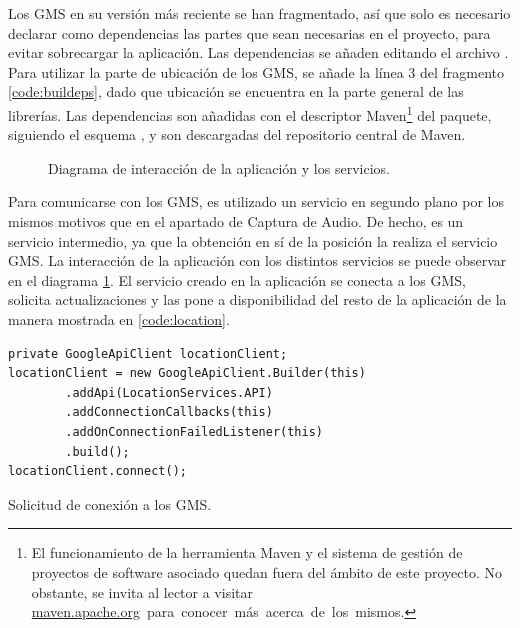 Los \ac{GMS} en su versión más reciente se han fragmentado, así que solo es necesario declarar como dependencias las partes que sean necesarias en el proyecto, para evitar sobrecargar la aplicación. Las dependencias se añaden editando el archivo . Para utilizar la parte de ubicación de los GMS, se añade la línea 3 del fragmento \ref{code:buildeps}, dado que ubicación se encuentra en la parte general de las librerías. Las dependencias son añadidas con el descriptor Maven\footnote{El funcionamiento de la herramienta Maven y el sistema de gestión de proyectos de software asociado quedan fuera del ámbito de este proyecto. No obstante, se invita al lector a visitar \mbox{\url{maven.apache.org} para conocer más acerca de los mismos.}} del paquete, siguiendo el esquema , y son descargadas del repositorio central de Maven.

\begin{figure}[h] \centering
{}
\caption{Diagrama de interacción de la aplicación y los servicios.}\label{fig:diagrama:servicios}
\end{figure}

Para comunicarse con los \ac{GMS}, es utilizado un servicio en segundo plano por los mismos motivos que en el apartado de Captura de Audio. De hecho, es un servicio intermedio, ya que la obtención en sí de la posición la realiza el servicio \ac{GMS}. La interacción de la aplicación con los distintos servicios se puede observar en el diagrama \ref{fig:diagrama:servicios}. El servicio creado en la aplicación se conecta a los \ac{GMS}, solicita actualizaciones y las pone a disponibilidad del resto de la aplicación de la manera mostrada en \ref{code:location}.

\begin{listing}[h] 
\begin{verbatim}
private GoogleApiClient locationClient;
locationClient = new GoogleApiClient.Builder(this)
        .addApi(LocationServices.API)
        .addConnectionCallbacks(this)
        .addOnConnectionFailedListener(this)
        .build();
locationClient.connect();
\end{verbatim}
\caption{Solicitud de conexión a los GMS.}
\label{code:location}
\end{listing}

